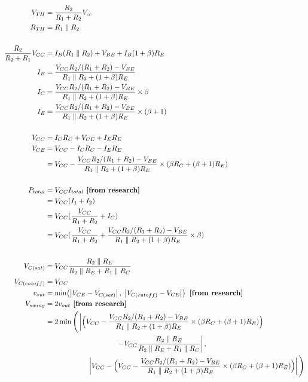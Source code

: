\documentclass[11pt, a4paper]{article}
\begin{document}
\begin{align*}
    V_{TH} & = \frac{R_2}{R_1 + R_2}V_{cc}\\
    R_{TH} & = R_1 \parallel R_2 \\ \\
    \frac{R_2}{R_2+R_1}V_{CC} &= I_B (R_1 \parallel R_2) + V_{BE} + I_B(1+\beta)R_E\\
    I_B &= \frac{V_{CC}R_2/(R_1+R_2)-V_{BE}}{R_1 \parallel R_2 + (1+\beta)R_E}\\
    I_C &= \frac{V_{CC}R_2/(R_1+R_2)-V_{BE}}{R_1 \parallel R_2 + (1+\beta)R_E} \times \beta\\
    I_E &= \frac{V_{CC}R_2/(R_1+R_2)-V_{BE}}{R_1 \parallel R_2 + (1+\beta)R_E} \times (\beta + 1)\\ \\
    V_{CC} &= I_C R_C + V_{CE} + I_E R_E\\
    V_{CE} &= V_{CC} - I_C R_C - I_E R_E\\
    & = V_{CC} - \frac{V_{CC}R_2/(R_1+R_2)-V_{BE}}{R_1 \parallel R_2 + (1+\beta)R_E} \times (\beta R_C + (\beta + 1) R_E)\\ \\
    P_{total} &= V_{CC} I_{total} \textbf{ [from research]}\\
    &= V_{CC} (I_1 + I_2)\\ 
    & = V_{CC} (\frac{V_{CC}}{R_1 + R_2} + I_C)\\
    & = V_{CC} (\frac{V_{CC}}{R_1 + R_2} + \frac{V_{CC}R_2/(R_1+R_2)-V_{BE}}{R_1 \parallel R_2 + (1+\beta)R_E} \times \beta) \\ \\
    V_{C(sat)} &= V_{CC} \frac{R_2 \parallel R_E}{R_2 \parallel R_E + R_1 \parallel R_C} \\
    V_{C(cutoff)} &= V_{CC}\\
    v_{out} &= \min\!\left(\left|V_{CE} - V_{C(sat)}\right|,\; \left|V_{C(cutoff)} - V_{CE}\right|\right) \textbf{ [from research]}\\
    V_{swing} &= 2v_{out} \textbf{ [from research]}\\
    &= 2\min\Bigg(
    \left|\vphantom{\frac{A}{B}}
        \Big(V_{CC} - \frac{V_{CC}R_2/(R_1+R_2)-V_{BE}}{R_1 \parallel R_2 + (1+\beta)R_E}
        \times (\beta R_C + (\beta + 1) R_E)\Big)\right.\\
    &\qquad\qquad\qquad\qquad\qquad
        \left.- V_{CC} \frac{R_2 \parallel R_E}{R_2 \parallel R_E + R_1 \parallel R_C}\right|, \\
    &\qquad\qquad\qquad \left|V_{CC} - \Big(V_{CC}
        - \frac{V_{CC}R_2/(R_1+R_2)-V_{BE}}{R_1 \parallel R_2 + (1+\beta)R_E}
        \times (\beta R_C + (\beta + 1) R_E)\Big)\right|
    \Bigg)
\end{align*}
\end{document}
